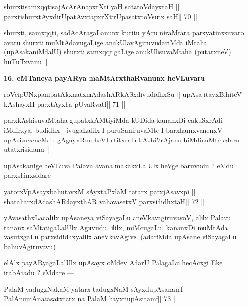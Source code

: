 \begin{shl}
shurxtisamxqqtisajAcArAnapxrXti yaH satatoVdayxtaH ||
parxtishurxtAyxdirUpatAvxtapxrXtirUpasatxtoV\s sutx saH\hfill || 70 ||
\end{shl}

\begin{artha}
shurxti, samxqqti, sadAcAragaLanunx kuritu yAru niraMtara parxyatinxsuvaro avaru shurxti muMtAdavugaLige anukUlavAgiruvudariMda iMtaha (upAsakaniMdalU) shurxti samxqqtigaLige anukUlisuvaMtaha (putarxneV) huTuTxvanu ||
\end{artha}

\begin{artha}
{\bf 16. eMTaneya payARya maMtArxthaRvanunx heVLuvaru ---}
\end{artha}

\begin{shl}
roVcipUNxpanipatAkxnatxmAdashARkASxdivudidhxSu ||
upAsa itayxBihiteV kAshayxH parxtAyxha pUvaRvatf\hfill || 71 ||
\end{shl}

\begin{artha}
parxkAshisuvaMtaha gupatxkAMtiyiMda kUDida kananxDi cakuSxrAdi iMdirxya, budidhx - ivugaLalilx I puruSaniruvaMte I barxhamxvanenxV upAsisuveneMdu gAgayxRnu heVLutitxralu kAshiVrAjanu hiMdinaMte edaru utatxrisidanu ||
\end{artha}

\begin{artha}
upAsakanige heVLuva Palavu avana makakxLalUlx heVge baruvudu ? eMdu parxshinxsidare ---
\end{artha}

\begin{shl}
yatorxVpAsayxbahutavxM sAyxtaPxlaM tatarx parxjAsavxpi ||
shataharxdAdashARdayxthAR vahavasetxV parxsididhxtaH\hfill || 72 ||
\end{shl}

\begin{artha}
yAvasathxLadalilx upAsaneya viSayagaLu aneVkavagiruvavoV, alilx Palavu tananx saMtatigaLalUlx Aguvudu. ililx, miMcugaLu, kananxDi muMtAda vasutxgaLu parxsididhxyalilx aneVkavAgive. (adariMda upAsane viSayagaLu bahuvAgiruvavu) ||
\end{artha} 
 
\begin{artha}
elAlx payARyagaLalUlx upAsayx oMdev AdarU PalagaLu hecAcxgi Eke irabAradu ? eMdare ---
\end{artha}

\begin{shl}
PalaM yadugxNakaM yatarx tadugxNaM sAyxdupAsanamf ||
PalAnumAnatasatxtarx na PalaM hayxnupAsitamf\hfill || 73 ||
\end{shl}

